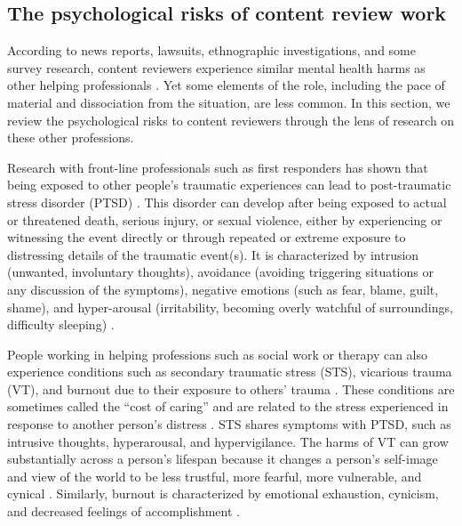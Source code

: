 \subsection{The psychological risks of content review work}
According to news reports, lawsuits, ethnographic investigations, and some survey research, content reviewers experience similar mental health harms as other helping professionals \cite{spence_content_2024}. Yet some elements of the role, including the pace of material and dissociation from the situation, are less common. In this section, we review the psychological risks to content reviewers through the lens of research on these other professions.

Research with front-line professionals such as first responders has shown that being exposed to other people's traumatic experiences can lead to post-traumatic stress disorder (PTSD) \cite{obuobi-donkor2022,spence_psychological_2023}. This disorder can develop after being exposed to actual or threatened death, serious injury, or sexual violence, either by experiencing or witnessing the event directly or through repeated or extreme exposure to distressing details of the traumatic event(s). It is characterized by intrusion (unwanted, involuntary thoughts), avoidance (avoiding triggering situations or any discussion of the symptoms), negative emotions (such as fear, blame, guilt, shame), and hyper-arousal (irritability, becoming overly watchful of surroundings, difficulty sleeping) \cite{apa2013,spence_psychological_2023}.

People working in helping professions such as social work or therapy can also experience conditions such as secondary traumatic stress (STS), vicarious trauma (VT), and burnout due to their exposure to others' trauma \cite{craig2010,greinacher2019,lee2018,spence_psychological_2023}. These conditions are sometimes called the ``cost of caring'' and are related to the stress experienced in response to another person's distress \cite{figley1995,spence_psychological_2023}. STS shares symptoms with PTSD, such as intrusive thoughts, hyperarousal, and hypervigilance. The harms of VT can grow substantially across a person's lifespan because it changes a person's self-image and view of the world to be less trustful, more fearful, more vulnerable, and cynical \cite{foley2021,krause2009,spence_psychological_2023}. Similarly, burnout is characterized by emotional exhaustion, cynicism, and decreased feelings of accomplishment \cite{brady2017,omalley2019,spence_psychological_2023}.

